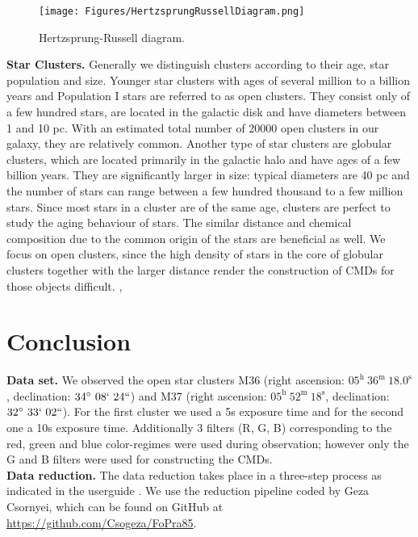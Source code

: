 \documentclass[fleqn,10pt]{SelfArx} %
\begin{document}
\begin{figure}%
    \centering
    \texttt{[image: Figures/HertzsprungRussellDiagram.png]}
    \caption{Hertzsprung-Russell diagram.\cite{Inglis}}
    \label{fig:HRD}
\end{figure}

\textbf{Star Clusters.}
Generally we distinguish clusters according to their age, star population and size. Younger star clusters with ages of several million to a billion years and Population I stars are referred to as open clusters. They consist only of a few hundred stars, are located in the galactic disk and have diameters between 1 and 10 pc. With an estimated total number of 20000 open clusters in our galaxy, they are relatively common. Another type of star clusters are globular clusters, which are located primarily in the galactic halo and have ages of a few billion years. They are significantly larger in size: typical diameters are 40 pc and the number of stars can range between a few hundred thousand to a few million stars. Since most stars in a cluster are of the same age, clusters are perfect to study the aging behaviour of stars. The similar distance and chemical composition due to the common origin of the stars are beneficial as well. We focus on open clusters, since the high density of stars in the core of globular clusters together with the larger distance render the construction of CMDs for those objects difficult. \cite{Stevenson}, \cite{guide}

\section{Conclusion}
\textbf{Data set.}
We observed the open star clusters M36 (right ascension: $05^{\mathrm{h}} \ 36^{\mathrm{m}} \ 18.0^{\mathrm{s}}$, declination: $34^{\circ} \ 08`\ 24``$) and M37 (right ascension: $05^{\mathrm{h}} \ 52^{\mathrm{m}} \ 18^{\mathrm{s}}$, declination: $32^{\circ} \ 33`\ 02``$). For the first cluster we used a 5s exposure time and for the second one a 10s exposure time. Additionally 3 filters (R, G, B) corresponding to the red, green and blue color-regimes were used during observation; however only the G and B filters were used for constructing the CMDs.
\\
\textbf{Data reduction.}
The data reduction takes place in a three-step process as indicated in the userguide \cite{guide}. We use the reduction pipeline coded by Geza Csornyei, which can be found on GitHub at \url{https://github.com/Csogeza/FoPra85}.
\end{document}
